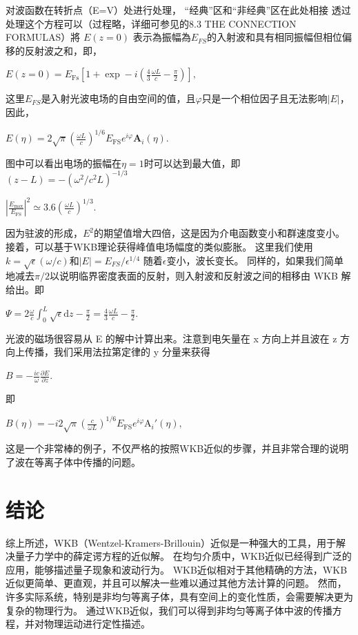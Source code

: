 \documentclass[12pt, a4paper, oneside]{ctexart}
\begin{document}
\begin{spacing}{2.0}
对波函数在转折点（E=V）处进行处理， “经典”区和“非经典”区在此处相接
透过处理这个方程可以（过程略，详细可参见\cite{griffiths_schroeter_2018}的8.3 THE CONNECTION FORMULAS）將 $E(z = 0)$ 表示為振幅為$E_{FS}$的入射波和具有相同振幅但相位偏移的反射波之和，即，
\begin{center}
    $\displaystyle E(z=0)=E_{\text{Fs}}\left[1+\exp-i\left(\frac{4}{3}\frac{\omega L}{c}-\frac{\pi}{2}\right)\right],$
\end{center}
这里$E_{FS}$是入射光波电场的自由空间的值，且$\varphi$只是一个相位因子且无法影响$|E|$，因此，
\begin{center}
    $\displaystyle E(\eta)=2\sqrt{\pi}\left(\frac{\omega L}{c}\right)^{1/6}E_{\text{FS}}e^{i\varphi}\mathbf{A}_i(\eta).$
\end{center}
图中可以看出电场的振幅在$\eta = 1$时可以达到最大值，即$(z-L) = -(\omega^2/c^2L)^{-1/3}$
\begin{center}
    $\displaystyle \left|\frac{E_{\max}}{E_{\text{FS}}}\right|^2\simeq3.6\left(\frac{\omega L}{c}\right)^{1/3}.$
\end{center}
因为驻波的形成，$E^2$的期望值增大四倍，这是因为介电函数变小和群速度变小。
接着，可以基于WKB理论获得峰值电场幅度的类似膨胀。 这里我们使用$k = \sqrt{\epsilon}(\omega/c)$和$|E| = E_{FS}/\epsilon^{1/4}$
随着$\epsilon$变小，波长变长。 
同样的，如果我们简单地减去$\pi/2$以说明临界密度表面的反射，则入射波和反射波之间的相移由 WKB 解给出。即
\begin{center}
    $\displaystyle \Psi=2\frac{\omega}{c}\int_{0}^{L}\sqrt{\epsilon}\mathrm{d}z-\frac{\pi}{2}=\frac{4}{3}\frac{\omega L}{c}-\frac{\pi}{2}.$
\end{center}

光波的磁场很容易从 E 的解中计算出来。注意到电矢量在 x 方向上并且波在 z 方向上传播，我们采用法拉第定律的 y 分量来获得
\begin{center}
    $\displaystyle B=-\frac{ic}{\omega}\frac{\partial E}{\partial z}.$
\end{center}即
\begin{center}
    $\displaystyle B(\eta)=-i2\sqrt{\pi}\left(\frac{c}{\omega L}\right)^{1/6}E_{\text{FS}}e^{i\varphi}\mathrm{A}_i'(\eta),$
\end{center}

这是一个非常棒的例子，不仅严格的按照WKB近似的步骤，并且非常合理的说明了波在等离子体中传播的问题。

\section{结论}
综上所述，WKB（Wentzel-Kramers-Brillouin）近似是一种强大的工具，用于解决量子力学中的薛定谔方程的近似解。
在均匀介质中，WKB近似已经得到广泛的应用，能够描述量子现象和波动行为。
WKB近似相对于其他精确的方法，WKB近似更简单、更直观，并且可以解决一些难以通过其他方法计算的问题。
然而，许多实际系统，特别是非均匀等离子体，具有空间上的变化性质，会需要解决更为复杂的物理行为。
通过WKB近似，我们可以得到非均匀等离子体中波的传播方程，并对物理运动进行定性描述。


\end{spacing}
\end{document}
